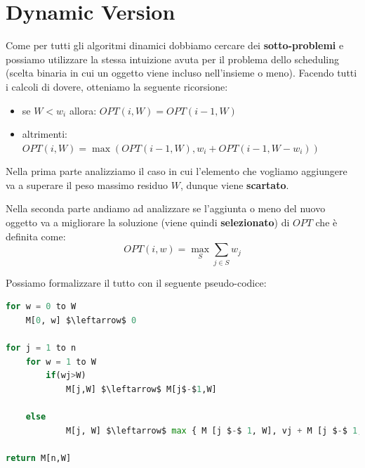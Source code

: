 \section{Dynamic Version}

Come per tutti gli algoritmi dinamici dobbiamo cercare dei
\textbf{sotto-problemi} e possiamo utilizzare la stessa intuizione avuta
per il problema dello scheduling (scelta binaria in cui un oggetto viene
incluso nell'insieme o meno). Facendo tutti i calcoli di dovere,
otteniamo la seguente ricorsione:
\begin{myblockquote}
  \begin{itemize}
    \item se $W < w_i$ allora:
          $OPT(i, W) = OPT(i-1,W)$
    \item altrimenti:
          $OPT(i, W) = \max(OPT(i-1, W), w_i + OPT(i-1, W-w_i))$
  \end{itemize}
\end{myblockquote}

Nella prima parte analizziamo il caso in cui l'elemento che vogliamo
aggiungere va a superare il peso massimo residuo $W$, dunque viene
\textbf{scartato}.

Nella seconda parte andiamo ad analizzare se l'aggiunta o meno del
nuovo oggetto va a migliorare la soluzione (viene quindi
\textbf{selezionato}) di $OPT$ che è definita come:
$$
  OPT(i, w) = \max_{S} \sum_{j \in S} w_j
$$

Possiamo formalizzare il tutto con il seguente pseudo-codice:

\begin{lstlisting}[language=Python, mathescape=true]
for w = 0 to W 
	M[0, w] $\leftarrow$ 0
	
for j = 1 to n
	for w = 1 to W
		if(wj>W) 
			M[j,W] $\leftarrow$ M[j$-$1,W]
		
    else 
			M[j, W] $\leftarrow$ max { M [j $-$ 1, W], vj + M [j $-$ 1, W $-$ wj] }

return M[n,W]
\end{lstlisting}


